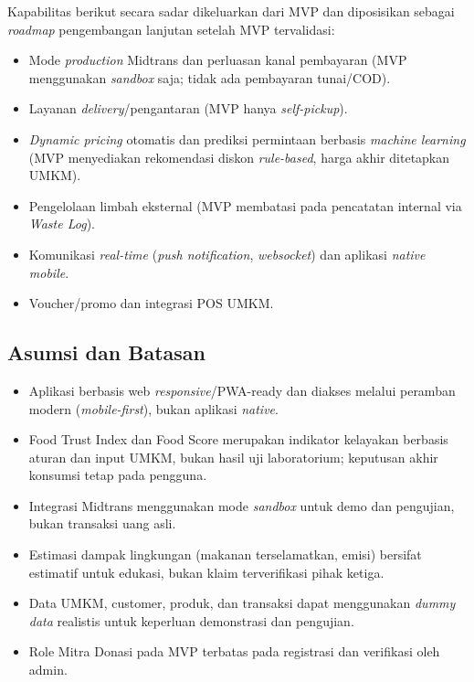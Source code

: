 Kapabilitas berikut secara sadar dikeluarkan dari MVP dan diposisikan sebagai \textit{roadmap}
pengembangan lanjutan setelah MVP tervalidasi:

\begin{itemize}[leftmargin=*]
    \item Mode \textit{production} Midtrans dan perluasan kanal pembayaran (MVP menggunakan
    \textit{sandbox} saja; tidak ada pembayaran tunai/COD).
    \item Layanan \textit{delivery}/pengantaran (MVP hanya \textit{self-pickup}).
    \item \textit{Dynamic pricing} otomatis dan prediksi permintaan berbasis \textit{machine learning}
    (MVP menyediakan rekomendasi diskon \textit{rule-based}, harga akhir ditetapkan UMKM).
    \item Pengelolaan limbah eksternal (MVP membatasi pada pencatatan internal via \textit{Waste Log}).
    \item Komunikasi \textit{real-time} (\textit{push notification}, \textit{websocket}) dan aplikasi
    \textit{native mobile}.
    \item Voucher/promo dan integrasi POS UMKM.
\end{itemize}

\subsection{Asumsi dan Batasan}

\begin{itemize}[leftmargin=*]
    \item Aplikasi berbasis web \textit{responsive}/PWA-ready dan diakses melalui peramban modern
    (\textit{mobile-first}), bukan aplikasi \textit{native}.
    \item Food Trust Index dan Food Score merupakan indikator kelayakan berbasis aturan dan input
    UMKM, bukan hasil uji laboratorium; keputusan akhir konsumsi tetap pada pengguna.
    \item Integrasi Midtrans menggunakan mode \textit{sandbox} untuk demo dan pengujian, bukan
    transaksi uang asli.
    \item Estimasi dampak lingkungan (makanan terselamatkan, emisi) bersifat estimatif untuk edukasi,
    bukan klaim terverifikasi pihak ketiga.
    \item Data UMKM, customer, produk, dan transaksi dapat menggunakan \textit{dummy data} realistis
    untuk keperluan demonstrasi dan pengujian.
    \item Role Mitra Donasi pada MVP terbatas pada registrasi dan verifikasi oleh admin.
\end{itemize}
